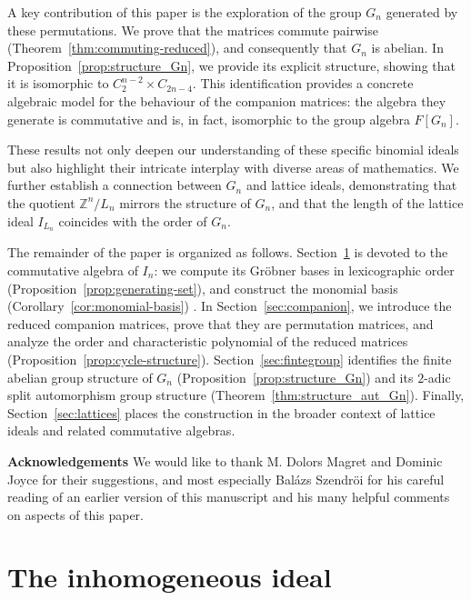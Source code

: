 \documentclass[11pt]{amsart}
\theoremstyle{plain}
\theoremstyle{definition}
\theoremstyle{remark}
\begin{document}
A key contribution of this paper is the exploration of the group \( G_n \) generated by these permutations. We prove that the matrices commute pairwise (Theorem~\ref{thm:commuting-reduced}), and consequently that \( G_n \) is abelian. In Proposition~\ref{prop:structure_Gn}, we provide its explicit structure, showing that it is isomorphic to \( C_2^{n-2} \times C_{2n-4} \). This identification provides a concrete algebraic model for the behaviour of the companion matrices: the algebra they generate is commutative and is, in fact, isomorphic to the group algebra \( F[G_n] \).

These results not only deepen our understanding of these specific binomial ideals but also highlight their intricate interplay with diverse areas of mathematics. We further establish a connection between \( G_n \) and lattice ideals, demonstrating that the quotient \(\mathbb{Z}^n / L_n\) mirrors the structure of \( G_n \), and that the length of the lattice ideal \( I_{L_n} \) coincides with the order of \( G_n \).

The remainder of the paper is organized as follows. Section~\ref{sec:groebner} is devoted to the commutative algebra of \( I_n \): we compute its Gr\"{o}bner bases in lexicographic order (Proposition~\ref{prop:generating-set}), and construct the monomial basis (Corollary~\ref{cor:monomial-basis}) . In Section~\ref{sec:companion}, we introduce the reduced companion matrices, prove that they are permutation matrices, and analyze the order and characteristic polynomial of the reduced matrices (Proposition~\ref{prop:cycle-structure}). Section~\ref{sec:fintegroup} identifies the finite abelian group structure of \( G_n \) (Proposition~\ref{prop:structure_Gn}) and its \(2 \)-adic split automorphism group structure (Theorem~\ref{thm:structure_aut_Gn}). Finally, Section~\ref{sec:lattices} places the construction in the broader context of lattice ideals and related commutative algebras.

\bigskip

\noindent\textbf{Acknowledgements} We would like to thank M. Dolors Magret and Dominic Joyce for their suggestions, and most especially Bal\'{a}zs Szendr\"{o}i for his careful reading of an earlier version of this manuscript and his many helpful comments on aspects of this paper.

\section{The inhomogeneous ideal}
\label{sec:groebner}
\end{document}

